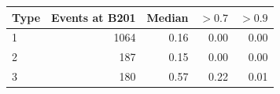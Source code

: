 \begin{tabular}{@{}lrrrr@{}}
\toprule
Type & Events at B201 & Median & $>0.7$ & $>0.9$ \\
\midrule
1 & 1064 & 0.16 & 0.00 & 0.00 \\
2 & 187 & 0.15 & 0.00 & 0.00 \\
3 & 180 & 0.57 & 0.22 & 0.01 \\
\bottomrule
\end{tabular}
